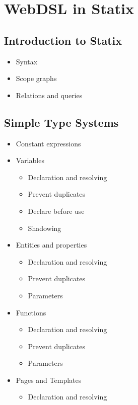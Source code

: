 
\chapter{\label{chap:statix}WebDSL in Statix}

  \section{Introduction to Statix}

    \begin{itemize}
      \item Syntax
      \item Scope graphs
      \item Relations and queries
    \end{itemize}
  
  \section{Simple Type Systems}

    \begin{itemize}
      \item Constant expressions
      \item Variables
      \begin{itemize}
        \item Declaration and resolving
        \item Prevent duplicates
        \item Declare before use
        \item Shadowing
      \end{itemize}
      \item Entities and properties
      \begin{itemize}
        \item Declaration and resolving
        \item Prevent duplicates
        \item Parameters
      \end{itemize}
      \item Functions
      \begin{itemize}
        \item Declaration and resolving
        \item Prevent duplicates
        \item Parameters
      \end{itemize}
      \item Pages and Templates
      \begin{itemize}
        \item Declaration and resolving
      \end{itemize}
    \end{itemize}


